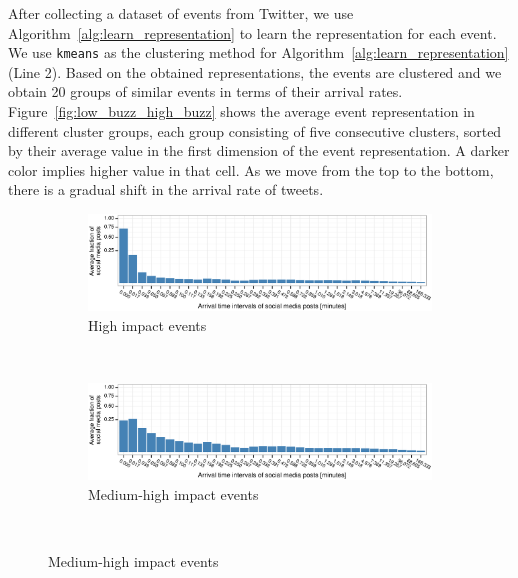 \documentclass[10pt,letterpaper]{article}
\begin{document}
After collecting a dataset of events from Twitter, we use
Algorithm~\ref{alg:learn_representation} to learn the representation
for each event. We use \texttt{kmeans} as the clustering method for
Algorithm~\ref{alg:learn_representation} (Line 2). Based on the
obtained representations, the events are clustered and we obtain 20
groups of similar events in terms of their arrival rates.
Figure~\ref{fig:low_buzz_high_buzz} shows the average event
representation in different cluster groups, each group consisting of
five consecutive clusters, sorted by their average value in the first
dimension of the event representation. A darker color implies higher
value in that cell. As we move from the top to the bottom, there is a
gradual shift in the arrival rate of tweets.

\begin{figure}
  \centering
  \begin{subfigure}[b]{0.5\textwidth}
    \includegraphics[width=\textwidth]{figures_SI/Plots_from_data/avg_hist_3_7}
    \caption{High impact events}
    \label{fig:highest}
  \end{subfigure}%
  ~
  \begin{subfigure}[b]{0.5\textwidth}
    \includegraphics[width=\textwidth]{figures_SI/Plots_from_data/avg_hist_19_16}
    \caption{Medium-high impact events}
    \label{fig:high}
  \end{subfigure}%
  ~


\end{figure}
\end{document}

